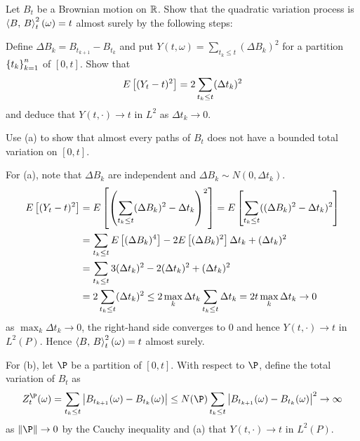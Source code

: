 \begin{exercise}{2.17}\label{ex:2.17}
    Let $B_t$ be a Brownian motion on $\mathbb{R}$. Show that the quadratic variation 
    process is $\left\langle {B},\, {B} \right\rangle_t^2(\omega) = t$ almost surely by the following steps: 
    \begin{thmenum}
        \item Define $\Delta B_k = B_{t_{k+1}} - B_{t_k}$ and put $Y(t,\omega) 
        = \sum_{t_k\leq t} (\Delta B_k)^2$ for a partition $\left\{ {t_k} \right\}_{k=1}^n$ of $[0,t]$. 
        Show that 
        \begin{equation*}
            E\left[ {(Y_t - t)^2} \right] = 2\sum_{t_k\leq t} (\Delta t_k)^2
        \end{equation*}
        and deduce that $Y(t,\cdot)\to t$ in $L^2$ as $\Delta t_k\to 0$. 
        \item Use (a) to show that almost every paths of $B_t$ does not have a bounded 
        total variation on $[0,t]$.
    \end{thmenum}
\end{exercise}
\begin{solution}
    For (a), note that $\Delta B_k$ are independent and $\Delta B_k\sim N(0, \Delta t_k)$. 
    \begin{equation*}
        \begin{split}
            E\sbrc{(Y_t - t)^2} &= E\sbrc{\pth{\sum_{t_k\leq t} (\Delta B_k)^2 - \Delta t_k}^2} 
            = E\sbrc{\sum_{t_k\leq t} ((\Delta B_k)^2 - \Delta t_k)^2} \\ 
            &= \sum_{t_k\leq t} E\sbrc{(\Delta B_k)^4} - 2E\sbrc{(\Delta B_k)^2}\Delta t_k + (\Delta t_k)^2 \\
            &= \sum_{t_k\leq t} 3(\Delta t_k)^2 - 2(\Delta t_k)^2 + (\Delta t_k)^2  \\
            &= 2\sum_{t_k\leq t} (\Delta t_k)^2\leq 2\max_{k}\Delta t_k\sum_{t_k\leq t} \Delta t_k 
            = 2t\max_{k}\Delta t_k\to 0
        \end{split}
    \end{equation*}
    as $\max_{k}\Delta t_k\to 0$, the right-hand side converges to $0$ and hence $Y(t, \cdot)\to t$ 
    in $L^2(P)$. Hence $\left\langle {B},\, {B} \right\rangle_t^2(\omega) = t$ almost surely. 

    For (b), let $\P$ be a partition of $[0,t]$. With respect to $\P$, define 
    the total variation of $B_t$ as 
    \begin{equation*}
        Z^\P_t(\omega) = \sum_{t_k\leq t} \abs{B_{t_{k+1}}(\omega) - B_{t_k}(\omega)} 
        \leq N(\P)\sum_{t_k\leq t} \abs{B_{t_{k+1}}(\omega) - B_{t_k}(\omega)}^2\to\infty
    \end{equation*}
    as $\norm{\P}\to 0$ by the Cauchy inequality and (a) that $Y(t, \cdot)\to t$ in $L^2(P)$.
\end{solution}

